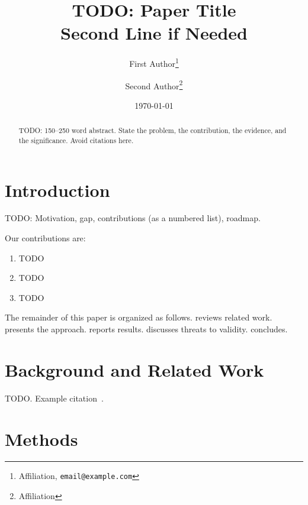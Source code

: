 \documentclass[11pt,a4paper]{article}
\title{TODO: Paper Title\\Second Line if Needed}
\author{First Author\thanks{Affiliation, \texttt{email@example.com}}
  \and Second Author\thanks{Affiliation}}
\date{\today}
\theoremstyle{plain}
\theoremstyle{remark}
\begin{document}
\maketitle

\begin{abstract}
TODO: 150–250 word abstract. State the problem, the contribution, the
evidence, and the significance. Avoid citations here.
\end{abstract}

\tableofcontents
\newpage

\section{Introduction}
\label{sec:intro}

TODO: Motivation, gap, contributions (as a numbered list), roadmap.

Our contributions are:
\begin{enumerate}
  \item TODO
  \item TODO
  \item TODO
\end{enumerate}

The remainder of this paper is organized as follows.
 reviews related work.
 presents the approach.
 reports results.
 discusses threats to validity.
 concludes.

\section{Background and Related Work}
\label{sec:background}

TODO. Example citation~\citep{author2024key}.

\section{Methods}
\label{sec:methods}
\end{document}
